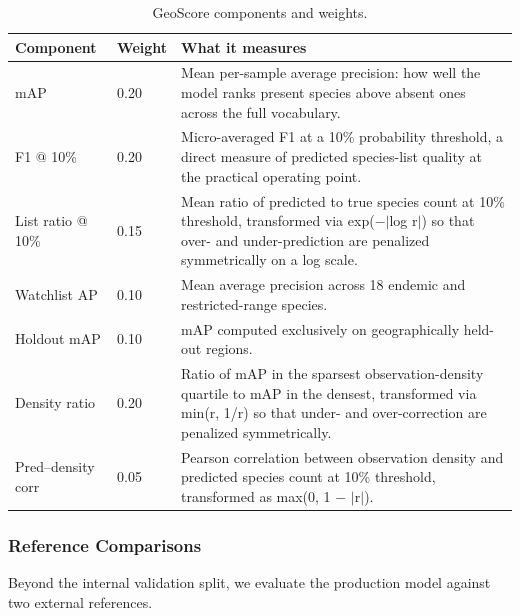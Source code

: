\begin{table}[htbp]
\centering
\caption{GeoScore components and weights.}
\label{tab:geoscore}
\small
\begin{tabularx}{\linewidth}{llL}
\toprule
Component & Weight & What it measures \\
\midrule
mAP & 0.20 & Mean per-sample average precision: how well the model ranks present species above absent ones across the full vocabulary. \\
F1 @ 10\% & 0.20 & Micro-averaged F1 at a 10\% probability threshold, a direct measure of predicted species-list quality at the practical operating point. \\
List ratio @ 10\% & 0.15 & Mean ratio of predicted to true species count at 10\% threshold, transformed via exp($-|$log r$|$) so that over- and under-prediction are penalized symmetrically on a log scale. \\
Watchlist AP & 0.10 & Mean average precision across 18 endemic and restricted-range species. \\
Holdout mAP & 0.10 & mAP computed exclusively on geographically held-out regions. \\
Density ratio & 0.20 & Ratio of mAP in the sparsest observation-density quartile to mAP in the densest, transformed via min(r, 1/r) so that under- and over-correction are penalized symmetrically. \\
Pred--density corr & 0.05 & Pearson correlation between observation density and predicted species count at 10\% threshold, transformed as max(0, 1 $-$ $|$r$|$). \\
\bottomrule
\end{tabularx}
\end{table}

\subsubsection{Reference Comparisons}
\label{sec:protocols}

Beyond the internal validation split, we evaluate the production model against two external references.

